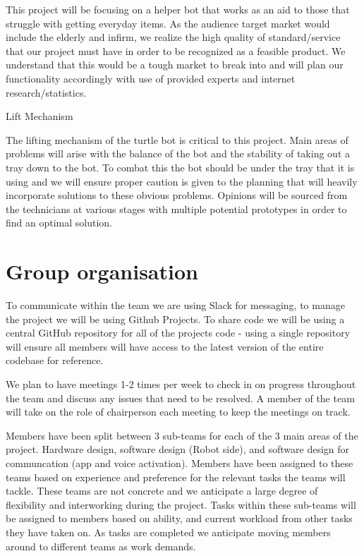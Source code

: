 \documentclass{article}
\begin{document}
This project will be focusing on a helper bot that works as an aid to those that struggle with getting everyday items. As the audience target market would include the elderly and infirm, we realize the high quality of standard/service that our project must have in order to be recognized as a feasible product. We understand that this would be a tough market to break into and will plan our functionality accordingly with use of provided experts and internet research/statistics.

Lift Mechanism

The lifting mechanism of the turtle bot is critical to this project. Main areas of problems will arise with the balance of the bot and the stability of taking out a tray down to the bot. To combat this the bot should be under the tray that it is using and we will ensure proper caution is given to the planning that will heavily incorporate solutions to these obvious problems. Opinions will be sourced from the technicians at various stages with multiple potential prototypes in order to find an optimal solution.

\section{Group organisation}

To communicate within the team we are using Slack for messaging, to manage the project we will be using Github Projects. To share code we will be using a central GitHub repository for all of the projects code - using a single repository will ensure all members will have access to the latest version of the entire codebase for reference.

We plan to have meetings 1-2 times per week to check in on progress throughout the team and discuss any issues that need to be resolved. A member of the team will take on the role of chairperson each meeting to keep the meetings on track. 

Members have been split between 3 sub-teams for each of the 3 main areas of the project. Hardware design, software design (Robot side), and software design for communcation (app and voice activation). Members have been assigned to these teams based on experience and preference for the relevant tasks the teams will tackle. These teams are not concrete and we anticipate a large degree of flexibility and interworking during the project. Tasks within these sub-teams will be assigned to members based on ability, and current workload from other tasks they have taken on. As tasks are completed we anticipate moving members around to different teams as work demands.
\end{document}
